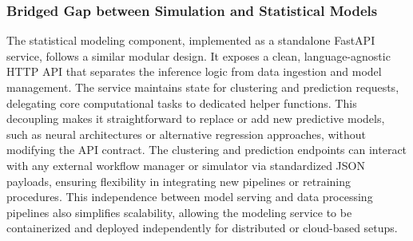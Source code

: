 \subsubsection{Bridged Gap between Simulation and Statistical Models}
\label{sec:statistical_modeling}
The statistical modeling component, implemented as a standalone FastAPI service, follows a similar modular design. It exposes a clean, language-agnostic HTTP API that separates the inference logic from data ingestion and model management. The service maintains state for clustering and prediction requests, delegating core computational tasks to dedicated helper functions. This decoupling makes it straightforward to replace or add new predictive models, such as neural architectures or alternative regression approaches, without modifying the API contract. The clustering and prediction endpoints can interact with any external workflow manager or simulator via standardized JSON payloads, ensuring flexibility in integrating new pipelines or retraining procedures. This independence between model serving and data processing pipelines also simplifies scalability, allowing the modeling service to be containerized and deployed independently for distributed or cloud-based setups.


